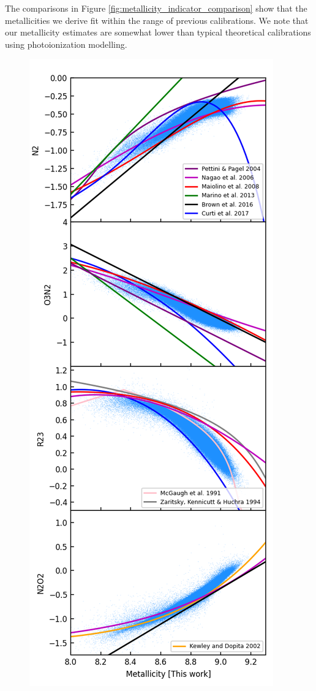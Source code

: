 \documentclass[fleqn,usenatbib]{mnras}
\begin{document}
The comparisons in Figure \ref{fig:metallicity_indicator_comparison} show that the metallicities we derive fit within the range of previous calibrations. We note that our metallicity estimates are somewhat lower than typical theoretical calibrations using photoionization modelling.

\begin{figure}
    \centering
    \includegraphics[width=0.95\columnwidth]{figures/figA1.png}

\end{figure}
\end{document}

